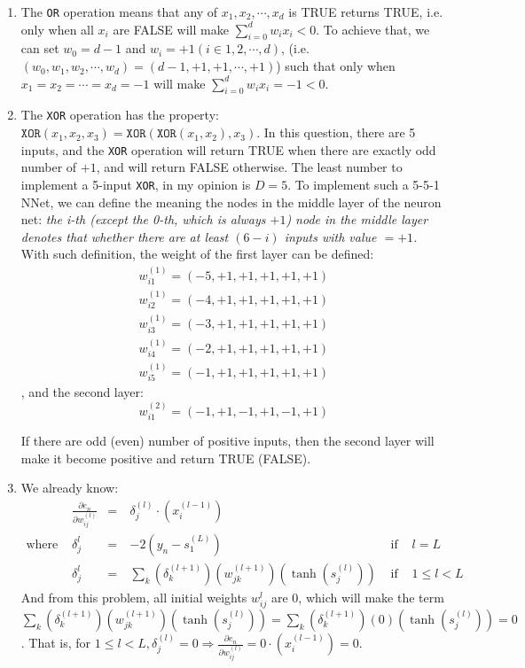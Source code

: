 \documentclass[11pt]{article}
\begin{document}
\begin{enumerate}[label=\textbf{\arabic*}.]
\begin{proof}
  \end{proof}

  \item The \texttt{OR} operation means that any of $x_1, x_2, \cdots, x_d$ is TRUE returns TRUE, i.e. only when all $x_i$ are FALSE will make $\sum_{i=0}^d w_i x_i < 0$. To achieve that, we can set $w_0 = d-1$ and $w_i = +1 (i \in 1, 2, \cdots , d)$, (i.e. $(w_0, w_1, w_2, \cdots, w_d) = (d-1, +1, +1, \cdots, +1)$) such that only when $x_1=x_2=\cdots = x_d = -1$ will make $\sum_{i=0}^d w_i x_i = -1 < 0$.

  \item The \texttt{XOR} operation has the property: $\mathtt{XOR}(x_1, x_2, x_3) = \mathtt{XOR}(\mathtt{XOR}(x_1, x_2),x_3)$. In this question, there are 5 inputs, and the \texttt{XOR} operation will return TRUE when there are exactly odd number of $+1$, and will return FALSE otherwise. The least number to implement a 5-input \texttt{XOR}, in my opinion is $D = 5$. To implement such a 5-5-1 NNet, we can define the meaning the nodes in the middle layer of the neuron net: \textit{the i-th (except the 0-th, which is always $+1$) node in the middle layer denotes that whether there are at least $(6-i)$ inputs with value $= +1$.} With such definition, the weight of the first layer can be defined:
  \[\begin{aligned}w_{i1}^{(1)} = (-5, +1, +1, +1, +1, +1) \\
  w_{i2}^{(1)} = (-4, +1, +1, +1, +1, +1) \\
  w_{i3}^{(1)} = (-3, +1, +1, +1, +1, +1) \\
  w_{i4}^{(1)} = (-2, +1, +1, +1, +1, +1) \\
  w_{i5}^{(1)} = (-1, +1, +1, +1, +1, +1)  \end{aligned}\]
  , and the second layer:
  \[w_{i1}^{(2)} = (-1, +1, -1, +1, -1, +1)\]

  If there are odd (even) number of positive inputs, then the second layer will make it become positive and return TRUE (FALSE).

  \item We already know: \[\begin{aligned} &\frac{\partial e_n}{\partial w_{ij}^{(l)}} &=\ & \delta_j^{(l)}\cdot \left(
  x_i^{(l-1)}\right) &\\ \text{where } & \delta_j^{l} &=\ & -2\left(y_n - s_1^{(L)}\right) & \text{ if }&l = L \\& \delta_j^{l} &=\ & \sum_k \left(\delta_k^{(l+1)}\right) \left(w_{jk}^{(l+1)}\right) \left(\tanh \left(s_j^{(l)}\right)\right) & \text{ if }&1 \leq l < L\end{aligned}\]
  And from this problem, all initial weights $w_{ij}^{l}$ are 0, which will make the term\\ $\sum_k \left(\delta_k^{(l+1)}\right) \left(w_{jk}^{(l+1)}\right) \left(\tanh \left(s_j^{(l)}\right)\right) = \sum_k \left(\delta_k^{(l+1)}\right) \left(0\right) \left(\tanh \left(s_j^{(l)}\right)\right) =  0$. That is, for $1 \leq l < L,\delta_j^{(l)} = 0 \Rightarrow \frac{\partial e_n}{\partial w_{ij}^{(l)}} = 0 \cdot \left(x_i^{(l-1)}\right)=0$.\par


\end{enumerate}
\end{document}

